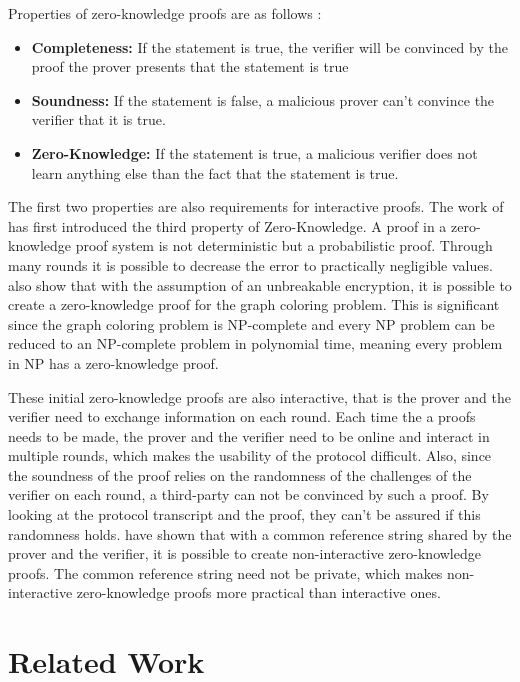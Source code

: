 Properties of zero-knowledge proofs are as follows \parencite{Groth.2010}:
\begin{itemize}
  \item \textbf{Completeness:} If the statement is true, the verifier will be convinced by the proof the prover presents that the statement is true
  \item \textbf{Soundness:} If the statement is false, a malicious prover can't convince the verifier that it is true.
  \item \textbf{Zero-Knowledge:} If the statement is true, a malicious verifier does not learn anything else than the fact that the statement is true.
\end{itemize}

The first two properties are also requirements for interactive proofs. The work of \cite{Goldwasser.1985} has first introduced the third property of Zero-Knowledge. A proof in a zero-knowledge proof system is not deterministic but a probabilistic proof. Through many rounds it is possible to decrease the error to practically negligible values. \cite{Goldreich.1991} also show that with the assumption of an unbreakable encryption, it is possible to create a zero-knowledge proof for the graph coloring problem. This is significant since the graph coloring problem is NP-complete and every NP problem can be reduced to an NP-complete problem in polynomial time, meaning every problem in NP has a zero-knowledge proof. 

These initial zero-knowledge proofs are also interactive, that is the prover and the verifier need to exchange information on each round. Each time the a proofs needs to be made, the prover and the verifier need to be online and interact in multiple rounds, which makes the usability of the protocol difficult. Also, since the soundness of the proof relies on the randomness of the challenges of the verifier on each round, a third-party can not be convinced by such a proof. By looking at the protocol transcript and the proof, they can't be assured if this randomness holds. \cite{Blum.1988} have shown that with a common reference string shared by the prover and the verifier, it is possible to create non-interactive zero-knowledge proofs. The common reference string need not be private, which makes non-interactive zero-knowledge proofs more practical than interactive ones.

\section{Related Work}